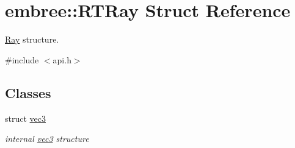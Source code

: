 \hypertarget{structembree_1_1_r_t_ray}{
\section{embree::RTRay Struct Reference}
\label{structembree_1_1_r_t_ray}
}


\hyperlink{structembree_1_1_ray}{Ray} structure.  




{\ttfamily \#include $<$api.h$>$}

\subsection*{Classes}
\begin{DoxyCompactItemize}
\item 
struct \hyperlink{structembree_1_1_r_t_ray_1_1vec3}{vec3}
\begin{DoxyCompactList}\small\item\em internal \hyperlink{structembree_1_1_r_t_ray_1_1vec3}{vec3} structure \item\end{DoxyCompactList}\end{DoxyCompactItemize}
